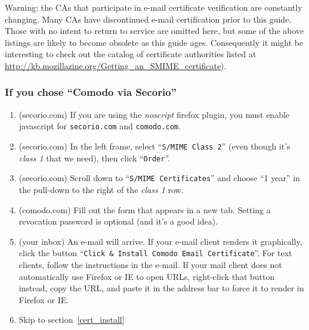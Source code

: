 {\tiny Warning: the CAs that participate in e-mail certificate
  verification are constantly changing.  Many CAs have discontinued
  e-mail certification prior to this guide.  Those with no intent to
  return to service are omitted here, but some of the above listings
  are likely to become obsolete as this guide ages.  Consequently it
  might be interesting to check out the catalog of certificate
  authorities listed at
  \url{http://kb.mozillazine.org/Getting_an_SMIME_certificate}).\par}

\begin{minipage}{\textwidth}
\subsubsection{If you chose ``Comodo via Secorio''}
\begin{multicols}{2}
  \begin{enumerate}
  \item (secorio.com) If you are using the \emph{noscript} firefox
    plugin, you must enable javascript for \texttt{secorio.com} and
    \texttt{comodo.com}.
  \item (secorio.com) In the left frame, select ``\texttt{S/MIME Class
      2}'' (even though it's \emph{class 1} that we need), then click
    ``\texttt{Order}''.
  \item (secorio.com) Scroll down to ``\texttt{S/MIME Certificates}''
    and choose ``1 year'' in the pull-down to the right of the
    \emph{class 1} row.
  \item (comodo.com) Fill out the form that appears in a new tab.
    Setting a revocation password is optional (and it's a good
    idea).%
  \item (your inbox) An e-mail will arrive.  If your e-mail client
    renders it graphically, click the button ``\texttt{Click \&
      Install Comodo Email Certificate}''.  For text clients, follow
    the instructions in the e-mail.  If your mail client does not
    automatically use Firefox or IE to open URLs, right-click that
    button instead, copy the URL, and paste it in the address bar to
    force it to render in Firefox or IE.
  \item Skip to section~\ref{cert_install}
  \end{enumerate}
\end{multicols}
\end{minipage}\\[1em]
  
